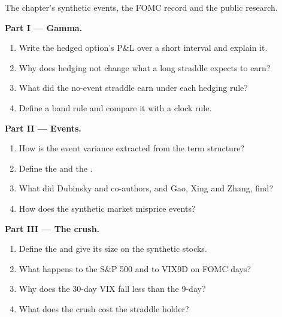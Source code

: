 \begin{problem}\label{pb:s2:gamma-scalping-and-event-volatility:1}
The chapter's synthetic events, the FOMC record and the public research.

\medskip\noindent\textbf{Part I --- Gamma.}
\begin{enumerate}
\item Write the hedged option's P\&L over a short interval and explain it.
\item Why does hedging not change what a long straddle expects to earn?
\item What did the no-event straddle earn under each hedging rule?
\item Define a band rule and compare it with a clock rule.
\end{enumerate}

\medskip\noindent\textbf{Part II --- Events.}
\begin{enumerate}[resume]
\item How is the event variance extracted from the term structure?
\item Define the  and the .
\item What did Dubinsky and co-authors, and Gao, Xing and Zhang, find?
\item How does the synthetic market misprice events?
\end{enumerate}

\medskip\noindent\textbf{Part III --- The crush.}
\begin{enumerate}[resume]
\item Define the  and give its size on the synthetic stocks.
\item What happens to the S\&P 500 and to VIX9D on FOMC days?
\item Why does the 30-day VIX fall less than the 9-day?
\item What does the crush cost the straddle holder?
\end{enumerate}


\end{problem}
